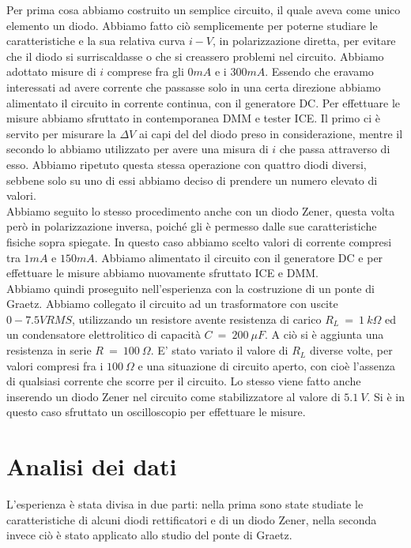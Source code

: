 \documentclass{article}
\begin{document}
Per prima cosa abbiamo costruito un semplice circuito, il quale aveva come unico elemento un diodo. Abbiamo fatto ciò semplicemente per poterne studiare le caratteristiche e la sua relativa curva $i-V$, in polarizzazione diretta, per evitare che il diodo si surriscaldasse o che si creassero problemi nel circuito. Abbiamo adottato misure di $i$ comprese fra gli $0mA$ e i $300mA$. Essendo che eravamo interessati ad avere corrente che passasse solo in una certa direzione abbiamo alimentato il circuito in corrente continua, con il generatore DC. Per effettuare le misure abbiamo sfruttato in contemporanea DMM e tester ICE. Il primo ci è servito per misurare la $\Delta V$ ai capi del del diodo preso in considerazione, mentre il secondo lo abbiamo utilizzato per avere una misura di $i$ che passa attraverso di esso. Abbiamo ripetuto questa stessa operazione con quattro diodi diversi, sebbene solo su uno di essi abbiamo deciso di prendere un numero elevato di valori. \\
Abbiamo seguito lo stesso procedimento anche con un diodo Zener, questa volta però in polarizzazione inversa, poiché gli è permesso dalle sue caratteristiche fisiche sopra spiegate. In questo caso abbiamo scelto valori di corrente compresi tra $1mA$ e $150mA$. Abbiamo alimentato il circuito con il generatore DC e per effettuare le misure abbiamo nuovamente sfruttato ICE e DMM. \\
Abbiamo quindi proseguito nell'esperienza con la costruzione di un ponte di Graetz. Abbiamo collegato il circuito ad un trasformatore con uscite $0 - 7.5 VRMS$, utilizzando un resistore avente resistenza di carico $R_L \ = \ 1 \ k \Omega$ ed un condensatore elettrolitico di capacità $C \ = \ 200 \ \mu F$. A ciò si è aggiunta una resistenza in serie $R \ = \ 100 \ \Omega$. E' stato variato il valore di $R_L$ diverse volte, per valori compresi fra i $100 \ \Omega$ e una situazione di circuito aperto, con cioè l'assenza di qualsiasi corrente che scorre per il circuito. Lo stesso viene fatto anche inserendo un diodo Zener nel circuito come stabilizzatore al valore di $5.1 \ V$. Si è in questo caso sfruttato un oscilloscopio per effettuare le misure.

\newpage

\section{Analisi dei dati}

L'esperienza è stata divisa in due parti: nella prima sono state studiate le caratteristiche di alcuni diodi rettificatori e di un diodo Zener, nella seconda invece ciò è stato applicato allo studio del ponte di Graetz.



\end{document}
